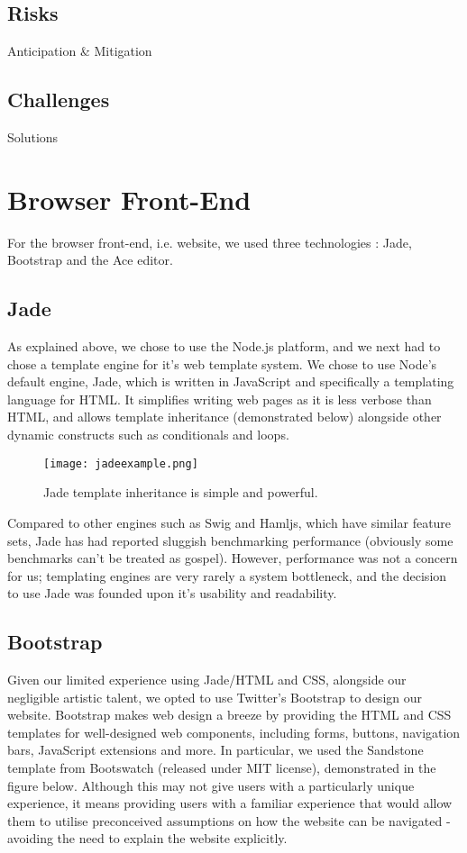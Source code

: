 \subsection{Risks}
Anticipation \& Mitigation

\subsection{Challenges}
Solutions

\section{Browser Front-End}

For the browser front-end, i.e. website, we used three technologies : Jade, Bootstrap and the Ace editor.


\subsection{Jade}
As explained above, we chose to use the Node.js platform, and we next had to chose a template engine for it's web template system. We chose to use Node's default engine, Jade\cite{jade}, which is written in JavaScript and specifically a templating language for HTML. It simplifies writing web pages as it is less verbose than HTML, and allows template inheritance (demonstrated below) alongside other dynamic constructs such as conditionals and loops.
\vspace{-2mm}
\begin{figure}[H]
\centering
\texttt{[image: jadeexample.png]}
\caption{Jade template inheritance is simple and powerful.}
\end{figure}

\noindent Compared to other engines such as Swig and Hamljs, which have similar feature sets, Jade has had reported sluggish benchmarking performance \cite{benchmarks} (obviously some benchmarks can't be treated as gospel). However, performance was not a concern for us; templating engines are very rarely a system bottleneck, and the decision to use Jade was founded upon it's usability and readability.

\subsection{Bootstrap}
Given our limited experience using Jade/HTML and CSS, alongside our negligible artistic talent, we opted to use Twitter's Bootstrap to design our website. Bootstrap makes web design a breeze by providing the HTML and CSS templates for well-designed web components, including forms, buttons, navigation bars, JavaScript extensions and more. In particular, we used the Sandstone\cite{sandstone} template from Bootswatch (released under MIT license), demonstrated in the figure below. Although this may not give users with a particularly unique experience, it means providing users with a familiar experience that would allow them to utilise preconceived assumptions on how the website can be navigated - avoiding the need to explain the website explicitly.

